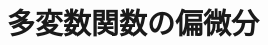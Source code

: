 \documentclass[../../topic_calculus]{subfiles}
\begin{document}
\chapter{多変数関数の偏微分}




\end{document}
